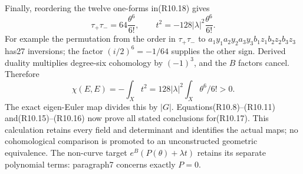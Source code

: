 Finally, reordering the twelve one-forms in(R10.18) gives
\[
 \tau_+\tau_-=64\frac{\theta^6}{6!},\qquad
 t^2=-128|\lambda|^2\frac{\theta^6}{6!}.                    \tag{R10.20}
\]
For example the permutation from the order in $\tau_+\tau_-$
to $a_1y_1a_2y_2a_3y_3b_1z_1b_2z_2b_3z_3$ has27 inversions;
the factor $(i/2)^6=-1/64$ supplies the other sign.
Derived duality multiplies degree-six cohomology by $(-1)^3$,
and the $B$ factors cancel. Therefore
\[
             \chi(E,E)=-\int_Xt^2
                  =128|\lambda|^2\int_X\theta^6/6!>0.      \tag{R10.21}
\]
The exact eigen-Euler map divides this by $|G|$.
Equations(R10.8)--(R10.11) and(R10.15)--(R10.16) now prove
all stated conclusions for(R10.17). This calculation retains
every field and determinant and identifies the actual maps;
no cohomological comparison is promoted to an unconstructed
geometric equivalence. The non-curve target
$e^B(P(\theta)+\lambda t)$ retains its separate polynomial
terms: paragraph7 concerns exactly $P=0$.
